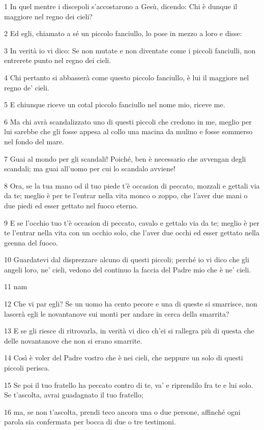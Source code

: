 \par 1 In quel mentre i discepoli s'accostarono a Gesù, dicendo: Chi è dunque il maggiore nel regno dei cieli?
\par 2 Ed egli, chiamato a sé un piccolo fanciullo, lo pose in mezzo a loro e disse:
\par 3 In verità io vi dico: Se non mutate e non diventate come i piccoli fanciulli, non entrerete punto nel regno dei cieli.
\par 4 Chi pertanto si abbasserà come questo piccolo fanciullo, è lui il maggiore nel regno de' cieli.
\par 5 E chiunque riceve un cotal piccolo fanciullo nel nome mio, riceve me.
\par 6 Ma chi avrà scandalizzato uno di questi piccoli che credono in me, meglio per lui sarebbe che gli fosse appesa al collo una macina da mulino e fosse sommerso nel fondo del mare.
\par 7 Guai al mondo per gli scandali! Poiché, ben è necessario che avvengan degli scandali; ma guai all'uomo per cui lo scandalo avviene!
\par 8 Ora, se la tua mano od il tuo piede t'è occasion di peccato, mozzali e gettali via da te; meglio è per te l'entrar nella vita monco o zoppo, che l'aver due mani o due piedi ed esser gettato nel fuoco eterno.
\par 9 E se l'occhio tuo t'è occasion di peccato, cavalo e gettalo via da te; meglio è per te l'entrar nella vita con un occhio solo, che l'aver due occhi ed esser gettato nella geenna del fuoco.
\par 10 Guardatevi dal disprezzare alcuno di questi piccoli; perché io vi dico che gli angeli loro, ne' cieli, vedono del continuo la faccia del Padre mio che è ne' cieli.
\par 11 nam
\par 12 Che vi par egli? Se un uomo ha cento pecore e una di queste si smarrisce, non lascerà egli le novantanove sui monti per andare in cerca della smarrita?
\par 13 E se gli riesce di ritrovarla, in verità vi dico ch'ei si rallegra più di questa che delle novantanove che non si erano smarrite.
\par 14 Così è voler del Padre vostro che è nei cieli, che neppure un solo di questi piccoli perisca.
\par 15 Se poi il tuo fratello ha peccato contro di te, va' e riprendilo fra te e lui solo. Se t'ascolta, avrai guadagnato il tuo fratello;
\par 16 ma, se non t'ascolta, prendi teco ancora una o due persone, affinché ogni parola sia confermata per bocca di due o tre testimoni.
